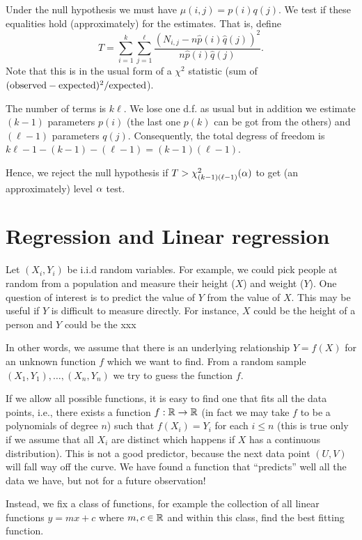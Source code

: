 \documentclass[preprint,  11pt]{amsart}
\begin{document}
Under the null hypothesis we must have $\mu(i,j)=p(i)q(j)$. We test if these equalities hold (approximately) for the estimates. That is, define
$$
T=\sum_{i=1}^{k}\sum_{j=1}^{\ell}\frac{(N_{i,j}-n\hat{p}(i)\hat{q}(j))^{2}}{n\hat{p}(i)\hat{q}(j)}.
$$
Note that this is in the usual form of a $\chi^{2}$ statistic (sum of $(\mbox{observed}-\mbox{expected})^{2}/\mbox{expected}$).

The number of terms is $k\ell$. We lose one d.f. as usual but in addition we estimate $(k-1)$ parameters $p(i)$ (the last one $p(k)$ can be got from the others) and $(\ell-1)$ parameters $q(j)$. Consequently, the total degress of freedom is $k\ell-1-(k-1)-(\ell-1)=(k-1)(\ell-1)$.

Hence, we reject the null hypothesis if $T>\chi_{(k-1)(\ell-1)}^{2}(\alpha)$ to get (an approximately) level $\alpha$ test.



\section{Regression and Linear regression}
Let $(X_{i},Y_{i})$ be i.i.d random variables. For example, we could pick people at random from a population and measure their height ($X$) and weight ($Y$). One question of interest is to predict the value of $Y$ from the value of $X$. This may be useful if $Y$ is difficult to measure directly. For instance, $X$ could be the height of a person and $Y$ could be the xxx

In other words, we assume that there is an underlying relationship $Y=f(X)$ for an unknown function $f$ which we want to find. From a random sample $(X_{1},Y_{1}),\ldots ,(X_{n},Y_{n})$  we try to guess the function $f$.

If we allow all possible functions, it is easy to find one that fits all the data points, i.e., there exists a function $f:\mathbb{R}\rightarrow \mathbb{R}$ (in fact we may take $f$ to be a polynomials of degree $n$) such that $f(X_{i})=Y_{i}$ for each $i\le n$ (this is true only if we assume that all $X_{i}$ are distinct which happens if $X$ has a continuous distribution). This is not a good predictor, because the next data point $(U,V)$ will fall way off the curve. We have found a function that ``predicts'' well all the data we have, but not for a future observation!

Instead, we fix a class of functions, for example the collection of all linear functions $y=mx+c$ where $m,c\in \mathbb{R}$ and within this class, find the best fitting function.
\end{document}
